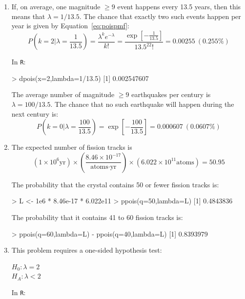 \begin{enumerate}
\item If, on average, one magnitude $\geq{9}$ event happens every 13.5
  years, then this means that $\lambda=1/13.5$. The chance that
  exactly two such events happen per year is given by
  Equation~\ref{eq:poispmf}:
  \[
  P\left(k=2|\lambda=\frac{1}{13.5}\right) = \frac{\lambda^k
    e^{-\lambda}}{k!} = \frac{\exp\left[-\frac{1}{13.5}\right]}{13.5^22!} =
  0.00255 ~ (0.255\%)
  \]

  In \texttt{R}:

\begin{console}
> dpois(x=2,lambda=1/13.5)
[1] 0.002547607
\end{console}

The average number of magnitude $\geq{9}$ earthquakes per century is
$\lambda={100/13.5}$. The chance that no such earthquake will happen
during the next century is:
  \[
  P\left(k=0|\lambda=\frac{100}{13.5}\right) =
  \exp\left[{-\frac{100}{13.5}}\right] =
  0.000607 ~ (0.0607\%)
  \]

\item The expected number of fission tracks is
  \[
  (1\times{10}^{6}\mbox{yr})
  \times
  \left(\frac{{8.46}\times{10}^{-17}}{\mbox{atoms}\cdot\mbox{yr}}\right)
  \times({6.022}\times{10}^{11}\mbox{atoms})=50.95
  \]

  The probability that the crystal contains 50 or fewer fission tracks
  is:

\begin{console}
> L <- 1e6 * 8.46e-17 * 6.022e11
> ppois(q=50,lambda=L)
[1] 0.4843836
\end{console}

The probability that it contains 41 to 60 fission tracks is:

\begin{console}
> ppois(q=60,lambda=L) - ppois(q=40,lambda=L)
[1] 0.8393979
\end{console}

\item This problem requires a one-sided hypothesis test:

  $H_0: \lambda=2$\\
  $H_{\!A}: \lambda<2$

In \texttt{R}:



\end{enumerate}
